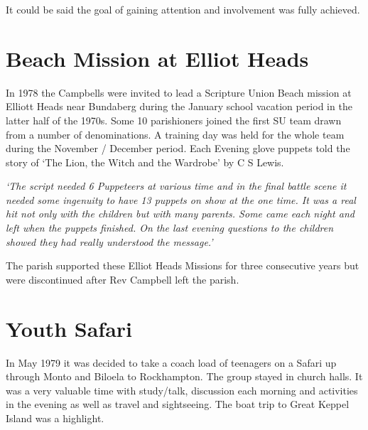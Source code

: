\smallskip


It could be said the goal of gaining attention and involvement was fully achieved.



\section{Beach Mission at Elliot Heads}



In 1978 the Campbells were invited to lead a Scripture Union Beach mission at Elliott Heads near Bundaberg during the January school vacation period in the latter half of the 1970s. Some 10 parishioners joined the first SU team drawn from a number of denominations. A training day was held for the whole team during the November / December period. Each Evening glove puppets told the story of `The Lion, the Witch and the Wardrobe' by C S Lewis.



\emph{`The script needed 6 Puppeteers at various time and in the final battle scene it needed some ingenuity to have 13 puppets on show at the one time. It was a real hit not only with the children but with many parents. Some came each night and left when the puppets finished. On the last evening questions to the children showed they had really understood the message.'}



The parish supported these Elliot Heads Missions for three consecutive years but were discontinued after Rev Campbell left the parish.



\section{Youth Safari}



In May 1979 it was decided to take a coach load of teenagers on a Safari up through Monto and Biloela to Rockhampton. The group stayed in church halls. It was a very valuable time with study/talk, discussion each morning and activities in the evening as well as travel and sightseeing. The boat trip to Great Keppel Island was a highlight.



